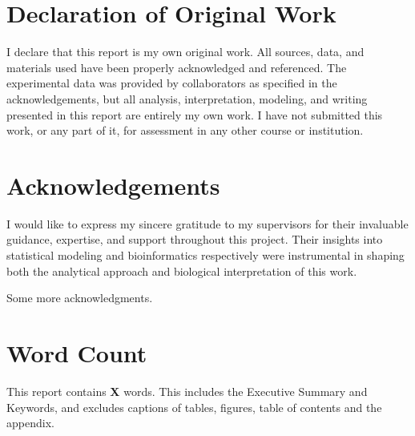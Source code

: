 \section*{Declaration of Original Work}

I declare that this report is my own original work. All sources, data, and materials used have been properly acknowledged and referenced. The experimental data was provided by collaborators as specified in the acknowledgements, but all analysis, interpretation, modeling, and writing presented in this report are entirely my own work. I have not submitted this work, or any part of it, for assessment in any other course or institution.

\section*{Acknowledgements}

I would like to express my sincere gratitude to my supervisors for their invaluable guidance, expertise, and support throughout this project. Their insights into statistical modeling and bioinformatics respectively were instrumental in shaping both the analytical approach and biological interpretation of this work.

Some more acknowledgments. 

\section*{Word Count}

This report contains \textbf{X} words. This includes the Executive Summary and Keywords, and excludes captions of tables, figures, table of contents and the appendix.

\newpage